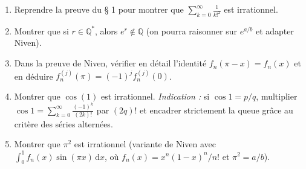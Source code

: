 \begin{mdframed}[style=exobar]
  \begin{enumerate}
    \item Reprendre la preuve du § 1 pour montrer que $\sum_{k=0}^{\infty} \frac{1}{k!^2}$
          est irrationnel.
    \item Montrer que si $r \in \mathbb{Q}^*$, alors $e^r \notin \mathbb{Q}$
          (on pourra raisonner sur $e^{a/b}$ et adapter Niven).
    \item Dans la preuve de Niven, vérifier en détail l'identité
          $f_n(\pi - x) = f_n(x)$ et en déduire $f_n^{(j)}(\pi) = (-1)^j f_n^{(j)}(0)$.
    \item Montrer que $\cos(1)$ est irrationnel. \emph{Indication :} si
          $\cos 1 = p/q$, multiplier
          $\cos 1 = \sum_{k=0}^{\infty} \frac{(-1)^k}{(2k)!}$ par $(2q)!$ et
          encadrer strictement la queue grâce au critère des séries alternées.
    \item Montrer que $\pi^2$ est irrationnel (variante de Niven avec
          $\int_0^1 f_n(x)\sin(\pi x)\,\mathrm{d}x$, où
          $f_n(x)=x^n{(1-x)}^n/n!$ et $\pi^2 = a/b$).
  \end{enumerate}
\end{mdframed}


